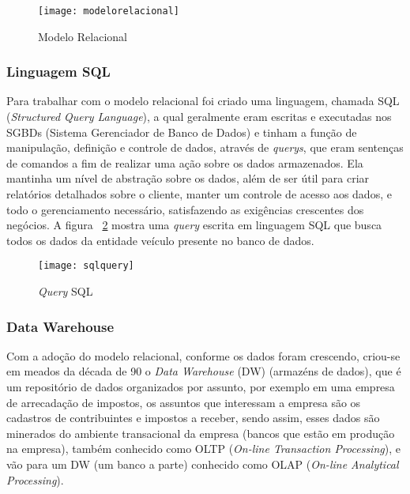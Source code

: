 \begin{figure}[!h]
\caption{\label{fig:modelorelacional} Modelo Relacional}
\begin{center}
\texttt{[image: modelorelacional]}
\end{center}
\end{figure}

\subsubsection{Linguagem SQL}
\label{subsubsec:sql}
Para trabalhar com o modelo relacional foi criado uma linguagem, chamada SQL (\textit{Structured Query Language}), a qual geralmente eram escritas e executadas nos SGBDs (Sistema Gerenciador de Banco de Dados) e tinham a função de manipulação, definição e controle de dados, através de \textit{querys}, que eram sentenças de comandos a fim de realizar uma ação sobre os dados armazenados. Ela mantinha um nível de abstração sobre os dados, além de ser útil para criar relatórios detalhados sobre o cliente, manter um controle de acesso aos dados, e todo o gerenciamento necessário, satisfazendo as exigências crescentes dos negócios. A figura ~\ref{fig:sqlquery} mostra uma \textit{query} escrita em linguagem SQL que busca todos os dados da entidade veículo presente no banco de dados.~\cite{sqlquery}

\begin{figure}[!h]
\caption{\label{fig:sqlquery} \textit{Query} SQL}
\begin{center}
\texttt{[image: sqlquery]}
\end{center}
\end{figure}

\subsubsection{Data Warehouse}
\label{subsubsec:datawarehouse}
Com a adoção do modelo relacional, conforme os dados foram crescendo, criou-se em meados da década de 90 o \textit{Data Warehouse} (DW) (armazéns de dados), que é um repositório de dados organizados por assunto, por exemplo em uma empresa de arrecadação de impostos, os assuntos que interessam a empresa são os cadastros de contribuintes e impostos a receber, sendo assim, esses dados são minerados do ambiente transacional da empresa (bancos que estão em produção na empresa), também conhecido como OLTP (\textit{On-line Transaction Processing}), e vão para um DW (um banco a parte) conhecido como OLAP (\textit{On-line Analytical Processing}).

